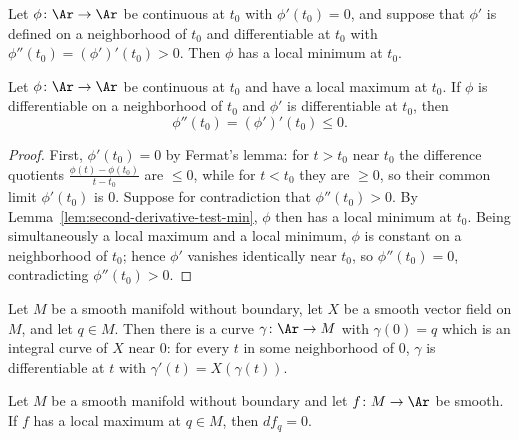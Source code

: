 \begin{lemma}
\label{lem:second-derivative-test-min}
\mathlibok
Let $\phi\colon\Ar\to\Ar$ be continuous at $t_0$ with $\phi'(t_0)=0$,
and suppose that $\phi'$ is defined on a neighborhood of $t_0$ and
differentiable at $t_0$ with $\phi''(t_0)=(\phi')'(t_0)>0$. Then
$\phi$ has a local minimum at $t_0$.
\end{lemma}

\begin{lemma}
\label{lem:second-derivative-test-max}
\leanok
Let $\phi\colon\Ar\to\Ar$ be continuous at $t_0$ and have a local
maximum at $t_0$. If $\phi$ is differentiable on a neighborhood of
$t_0$ and $\phi'$ is differentiable at $t_0$, then
$$\phi''(t_0)=(\phi')'(t_0)\le 0.$$
\end{lemma}

\begin{proof}
\leanok
{}
First, $\phi'(t_0)=0$ by Fermat's lemma: for $t>t_0$ near $t_0$ the
difference quotients $\frac{\phi(t)-\phi(t_0)}{t-t_0}$ are $\le0$,
while for $t<t_0$ they are $\ge0$, so their common limit $\phi'(t_0)$
is $0$. Suppose for contradiction that $\phi''(t_0)>0$. By
Lemma~\ref{lem:second-derivative-test-min}, $\phi$ then has a local
minimum at $t_0$. Being simultaneously a local maximum and a local
minimum, $\phi$ is constant on a neighborhood of $t_0$; hence $\phi'$
vanishes identically near $t_0$, so $\phi''(t_0)=0$, contradicting
$\phi''(t_0)>0$.
\end{proof}

\begin{lemma}
\label{lem:integral-curve-exists}
\mathlibok
Let $M$ be a smooth manifold without boundary, let $X$ be a smooth
vector field on $M$, and let $q\in M$. Then there is a curve
$\gamma\colon\Ar\to M$ with $\gamma(0)=q$ which is an integral curve
of $X$ near $0$: for every $t$ in some neighborhood of $0$, $\gamma$
is differentiable at $t$ with $\gamma'(t)=X(\gamma(t))$.
\end{lemma}

\begin{lemma}
\label{lem:differential-vanishes-at-max}
\leanok
Let $M$ be a smooth manifold without boundary and let $f\colon M\to\Ar$
be smooth. If $f$ has a local maximum at $q\in M$, then $df_q=0$.
\end{lemma}

